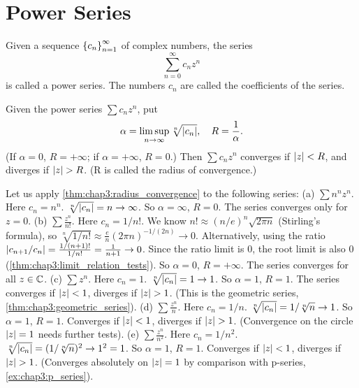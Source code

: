 \section{Power Series}
\label{sec:chap3:power_series}

\begin{definition} %
  \label{def:chap3:power_series}
  Given a sequence $\left\{ c_n \right\}_{n=1}^\infty$ of complex numbers, the series
  \[ \sum_{n=0}^\infty c_n z^n \]
  is called a power series. The numbers $c_n$ are called the
  coefficients of the series.
\end{definition}

\begin{theorem} %
  \label{thm:chap3:radius_convergence}
  Given the power series $\sum c_n z^n$, put
  \[ \alpha = \limsup_{n \to \infty} \sqrt[n]{\left\lvert c_n \right\rvert}, \quad R =
  \frac{1}{\alpha}. \]
  (If $\alpha = 0$, $R = +\infty$; if $\alpha = +\infty$, $R=0$.)
  Then $\sum c_n z^n$ converges if $\left\lvert z \right\rvert < R$, and diverges if $\left\lvert z \right\rvert > R$.
  (R is called the radius of convergence.)
\end{theorem}


\begin{example} %
  \label{ex:chap3:radius_convergence_examples}
  Let us apply \autoref{thm:chap3:radius_convergence} to the following series:
  (a) $\sum n^n z^n$. Here $c_n = n^n$. $\sqrt[n]{\left\lvert c_n \right\rvert} = n \to
  \infty$. So $\alpha = \infty$, $R=0$. The series converges only for $z=0$.
  (b) $\sum \frac{z^n}{n!}$. Here $c_n = 1/n!$. We know $n! \approx
  (n/e)^n \sqrt{2\pi n}$ (Stirling's formula), so $\sqrt[n]{1/n!}
  \approx \frac{e}{n} (2\pi n)^{-1/(2n)} \to 0$. Alternatively, using
  the ratio $\left\lvert c_{n+1}/c_n \right\rvert = \frac{1/(n+1)!}{1/n!} =
  \frac{1}{n+1} \to 0$. Since the ratio limit is 0, the root limit is
  also 0 (\autoref{thm:chap3:limit_relation_tests}). So $\alpha = 0$,
  $R=+\infty$. The series converges for all $z \in \mathbb{C}$.
  (c) $\sum z^n$. Here $c_n = 1$. $\sqrt[n]{\left\lvert c_n \right\rvert} = 1 \to 1$. So
  $\alpha = 1$, $R=1$. The series converges if $\left\lvert z \right\rvert < 1$,
  diverges if $\left\lvert z \right\rvert > 1$. (This is the geometric series,
  \autoref{thm:chap3:geometric_series}).
  (d) $\sum \frac{z^n}{n}$. Here $c_n = 1/n$. $\sqrt[n]{\left\lvert c_n \right\rvert} =
  1/\sqrt[n]{n} \to 1$. So $\alpha=1$, $R=1$. Converges if $\left\lvert z \right\rvert <
  1$, diverges if $\left\lvert z \right\rvert > 1$. (Convergence on the circle
  $\left\lvert z \right\rvert=1$ needs further tests).
  (e) $\sum \frac{z^n}{n^2}$. Here $c_n = 1/n^2$.
  $\sqrt[n]{\left\lvert c_n \right\rvert} = (1/\sqrt[n]{n})^2 \to 1^2 = 1$. So
  $\alpha=1$, $R=1$. Converges if $\left\lvert z \right\rvert < 1$, diverges if $\left\lvert z \right\rvert
  > 1$. (Converges absolutely on $\left\lvert z \right\rvert=1$ by comparison with
  p-series, \autoref{ex:chap3:p_series}).
\end{example}

